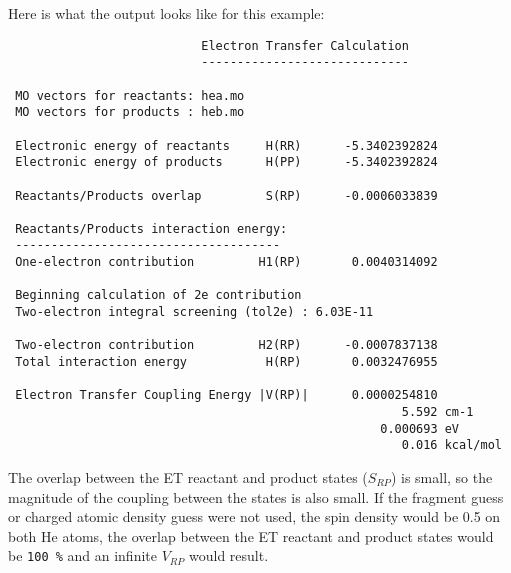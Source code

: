 Here is what the output looks like for this example:
\begin{verbatim}
                           Electron Transfer Calculation
                           -----------------------------

 MO vectors for reactants: hea.mo
 MO vectors for products : heb.mo

 Electronic energy of reactants     H(RR)      -5.3402392824
 Electronic energy of products      H(PP)      -5.3402392824

 Reactants/Products overlap         S(RP)      -0.0006033839

 Reactants/Products interaction energy:
 -------------------------------------
 One-electron contribution         H1(RP)       0.0040314092

 Beginning calculation of 2e contribution
 Two-electron integral screening (tol2e) : 6.03E-11

 Two-electron contribution         H2(RP)      -0.0007837138
 Total interaction energy           H(RP)       0.0032476955

 Electron Transfer Coupling Energy |V(RP)|      0.0000254810
                                                       5.592 cm-1
                                                    0.000693 eV
                                                       0.016 kcal/mol

\end{verbatim}

The overlap between the ET reactant and product states ($S_{RP}$) is small,
so the magnitude of the coupling between the states is also small. 
If the fragment guess
or charged atomic density guess were not used, the spin density would be 0.5 on both He atoms, the overlap between
the ET reactant and product states would be \verb+100 %+ and an infinite
$V_{RP}$ would result.
